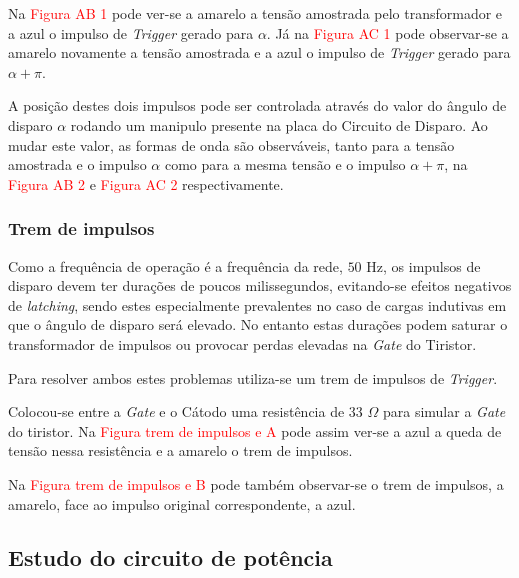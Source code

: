 \documentclass[a4paper,11pt]{article}
\numberwithin{equation}{section}
\begin{document}


Na \textcolor{red}{Figura AB 1} pode ver-se a amarelo a tensão amostrada pelo transformador e a azul o impulso de \textit{Trigger} gerado para $\alpha$. Já na \textcolor{red}{Figura AC 1} pode observar-se a amarelo novamente a tensão amostrada e a azul o impulso de \textit{Trigger} gerado para $\alpha + \pi$.

A posição destes dois impulsos pode ser controlada através do valor do ângulo de disparo $\alpha$ rodando um manipulo presente na placa do Circuito de Disparo. Ao mudar este valor, as formas de onda são observáveis, tanto para a tensão amostrada e o impulso $\alpha$ como para a mesma tensão e o impulso  $\alpha + \pi$, na \textcolor{red}{Figura AB 2} e \textcolor{red}{Figura AC 2} respectivamente.




\subsubsection{Trem de impulsos}

Como a frequência de operação é a frequência da rede, $50$ Hz, os impulsos de disparo devem ter durações de poucos milissegundos, evitando-se efeitos negativos de \textit{latching}, sendo estes especialmente prevalentes no caso de cargas indutivas em que o ângulo de disparo será elevado. No entanto estas durações podem saturar o transformador de impulsos ou provocar perdas elevadas na \textit{Gate} do Tiristor.

Para resolver ambos estes problemas utiliza-se um trem de impulsos de \textit{Trigger}.


Colocou-se entre a \textit{Gate} e o Cátodo uma resistência de $33$ $\Omega$ para simular a \textit{Gate} do tiristor. Na \textcolor{red}{Figura trem de impulsos e A} pode assim ver-se a azul a queda de tensão nessa resistência e a amarelo o trem de impulsos.


Na \textcolor{red}{Figura trem de impulsos e B} pode também observar-se o trem de impulsos, a amarelo, face ao impulso original correspondente, a azul.


\subsection{Estudo do circuito de potência}
\end{document}

